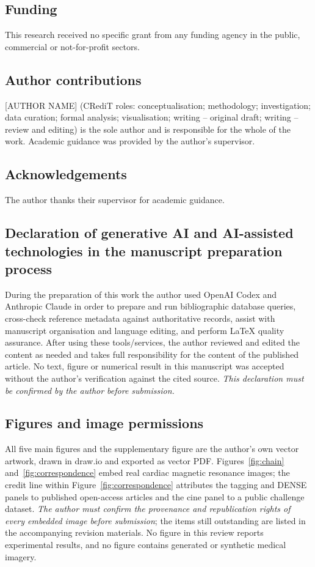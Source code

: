 \documentclass[11pt,a4paper]{article}
\begin{document}
\subsection*{Funding}
This research received no specific grant from any funding agency in the public, commercial or
not-for-profit sectors.

\subsection*{Author contributions}
[AUTHOR NAME] (CRediT roles: conceptualisation; methodology; investigation; data curation; formal
analysis; visualisation; writing -- original draft; writing -- review and editing) is the sole
author and is responsible for the whole of the work. Academic guidance was provided by the author's
supervisor.

\subsection*{Acknowledgements}
The author thanks their supervisor for academic guidance.

\subsection*{Declaration of generative AI and AI-assisted technologies in the manuscript preparation process}
During the preparation of this work the author used OpenAI Codex and Anthropic Claude in order to
prepare and run bibliographic database queries, cross-check reference metadata against authoritative
records, assist with manuscript organisation and language editing, and perform LaTeX quality
assurance. After using these tools/services, the author reviewed and edited the content as needed
and takes full responsibility for the content of the published article. No text, figure or numerical
result in this manuscript was accepted without the author's verification against the cited source.
\emph{This declaration must be confirmed by the author before submission.}

\subsection*{Figures and image permissions}
All five main figures and the supplementary figure are the author's own vector artwork, drawn in
draw.io and exported as vector PDF. Figures~\ref{fig:chain} and~\ref{fig:correspondence} embed real
cardiac magnetic resonance images; the credit line within Figure~\ref{fig:correspondence} attributes
the tagging and DENSE panels to published open-access articles and the cine panel to a public
challenge dataset. \emph{The author must confirm the provenance and republication rights of every
embedded image before submission}; the items still outstanding are listed in the accompanying
revision materials. No figure in this review reports experimental results, and no figure contains
generated or synthetic medical imagery.
\end{document}
